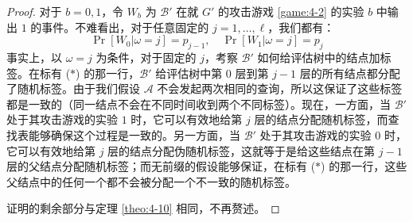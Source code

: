 \begin{proof}
\vspace{10pt}

对于 $b=0,1$，令 $W_b$ 为 $\mathcal{B}'$ 在就 $G'$ 的攻击游戏 \ref{game:4-2} 的实验 $b$ 中输出 $1$ 的事件。不难看出，对于任意固定的 $j=1,\dots,\ell$，我们都有：
\[
\Pr[W_0|\omega=j]=p_{j-1},
\quad
\Pr[W_1|\omega=j]=p_j
\]
事实上，以 $\omega=j$ 为条件，对于固定的 $j$，考察 $\mathcal{B}'$ 如何给评估树中的结点加标签。在标有 ($*$) 的那一行，$\mathcal{B}'$ 给评估树中第 $0$ 层到第 $j-1$ 层的所有结点都分配了随机标签。由于我们假设 $\mathcal{A}$ 不会发起两次相同的查询，所以这保证了这些标签都是一致的（同一结点不会在不同时间收到两个不同标签）。现在，一方面，当 $\mathcal{B}'$ 处于其攻击游戏的实验 $1$ 时，它可以有效地给第 $j$ 层的结点分配随机标签，而查找表能够确保这个过程是一致的。另一方面，当 $\mathcal{B}'$ 处于其攻击游戏的实验 $0$ 时，它可以有效地给第 $j$ 层的结点分配伪随机标签，这就等于是给这些结点在第 $j-1$ 层的父结点分配随机标签；而无前缀的假设能够保证，在标有 ($*$) 的那一行，这些父结点中的任何一个都不会被分配一个不一致的随机标签。

证明的剩余部分与定理 \ref{theo:4-10} 相同，不再赘述。
\end{proof}